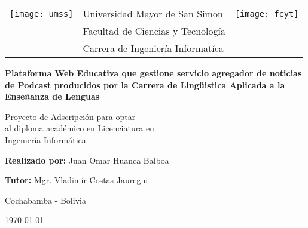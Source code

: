 \begin{titlepage}
	
	\begin{tabular}{llr}

		\texttt{[image: umss]} 	& \Large Universidad Mayor de San Simon  			& \texttt{[image: fcyt]} \\
											& \Large Facultad de Ciencias y Tecnolog\'{i}a 	& \\
											& \Large Carrera de Ingenier\'{i}a Informat\'{i}ca & \\
	\end{tabular}
	
	
	\begin{center}
		\normalsize
		
		\vspace{1.5cm}
		
		\textbf{Plataforma Web Educativa que gestione servicio agregador de noticias de Podcast producidos por la Carrera de Ling\"{u}istica Aplicada a la Enseñanza de Lenguas} \\
	
		\vspace{1.5cm}
	
		\small
	\end{center}
		
	\begin{flushright}
		Proyecto de Adscripci\'{o}n para optar \\ 
		al diploma acad\'{e}mico en Licenciatura en \\ 
		Ingenier\'{i}a 	Inform\'{a}tica \\
	
	\end{flushright}
	
	\begin{center}
		
		\vspace{1.5cm}
			
		\textbf{Realizado por:} Juan Omar Huanca Balboa \\
	
		\vspace{1.5cm}
	
		\textbf{Tutor:} Mgr. Vladimir Costas Jauregui \\
		
		\vspace{1.5cm}
		
		Cochabamba - Bolivia
	
		\vspace{1.5cm}
		
			
		\monthyeardate\today
		
	\end{center}			

\end{titlepage}